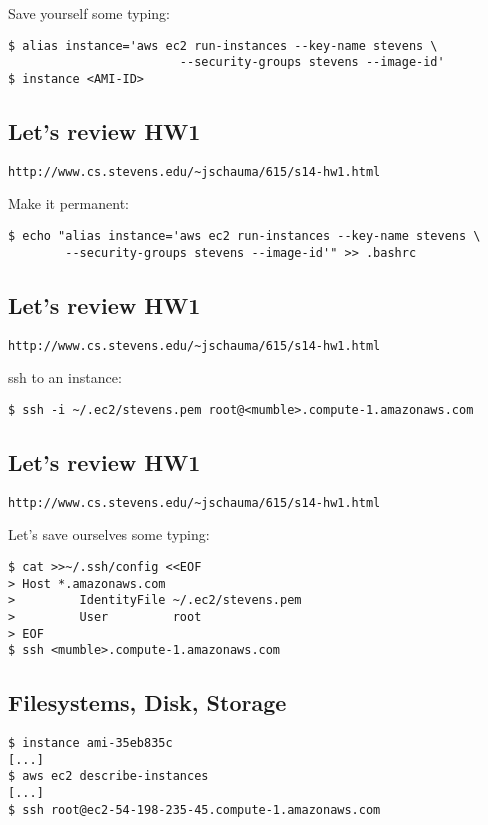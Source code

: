 \documentclass[xga]{xdvislides}
\begin{document}
Save yourself some typing:
\begin{verbatim}
$ alias instance='aws ec2 run-instances --key-name stevens \
                        --security-groups stevens --image-id'
$ instance <AMI-ID>
\end{verbatim}

\subsection{Let's review HW1}
{\tt http://www.cs.stevens.edu/\~{}jschauma/615/s14-hw1.html} \\
\vspace{.5in}


Make it permanent:
\begin{verbatim}
$ echo "alias instance='aws ec2 run-instances --key-name stevens \
        --security-groups stevens --image-id'" >> .bashrc
\end{verbatim}


\subsection{Let's review HW1}
{\tt http://www.cs.stevens.edu/\~{}jschauma/615/s14-hw1.html} \\
\vspace{.5in}

ssh to an instance:
\begin{verbatim}
$ ssh -i ~/.ec2/stevens.pem root@<mumble>.compute-1.amazonaws.com
\end{verbatim}


\subsection{Let's review HW1}
{\tt http://www.cs.stevens.edu/\~{}jschauma/615/s14-hw1.html} \\
\vspace{.5in}

Let's save ourselves some typing:
\begin{verbatim}
$ cat >>~/.ssh/config <<EOF
> Host *.amazonaws.com
>         IdentityFile ~/.ec2/stevens.pem
>         User         root
> EOF
$ ssh <mumble>.compute-1.amazonaws.com
\end{verbatim}


\subsection{Filesystems, Disk, Storage}
\begin{verbatim}
$ instance ami-35eb835c
[...]
$ aws ec2 describe-instances
[...]
$ ssh root@ec2-54-198-235-45.compute-1.amazonaws.com
\end{verbatim}
\end{document}
